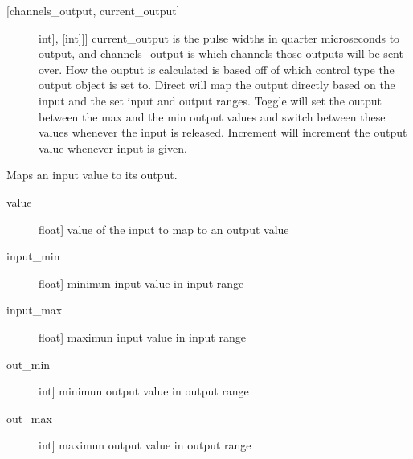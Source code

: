 \documentclass[letterpaper,10pt,english]{sphinxmanual}
\begin{document}
\begin{fulllineitems}
\begin{fulllineitems}
\sphinxAtStartPar
{}
\begin{description}
\item[{{[}channels\_output, current\_output{]}}] \leavevmode{[}{[}{[}int{]}, {[}int{]}{]}{]}
\sphinxAtStartPar
current\_output is the pulse widths in quarter microseconds to output, and channels\_output
is which channels those outputs will be sent over. How the ouptut is calculated is based
off of which control type the output object is set to. Direct will map the output directly
based on the input and the set input and output ranges. Toggle will set the output between
the max and the min output values and switch between these values whenever the input is
released. Increment will increment the output value whenever input is given.

\end{description}

\end{fulllineitems}


\begin{fulllineitems}
\label{\detokenize{specific:NeckTiltOutput.NeckTiltOutput.map_values}}
\sphinxAtStartPar
Maps an input value to its output.

\sphinxAtStartPar
{}
\begin{description}
\item[{value}] \leavevmode{[}float{]}
\sphinxAtStartPar
value of the input to map to an output value

\item[{input\_min}] \leavevmode{[}float{]}
\sphinxAtStartPar
minimun input value in input range

\item[{input\_max}] \leavevmode{[}float{]}
\sphinxAtStartPar
maximun input value in input range

\item[{out\_min}] \leavevmode{[}int{]}
\sphinxAtStartPar
minimun output value in output range

\item[{out\_max}] \leavevmode{[}int{]}
\sphinxAtStartPar
maximun output value in output range


\end{description}
\end{fulllineitems}
\end{fulllineitems}
\end{document}
